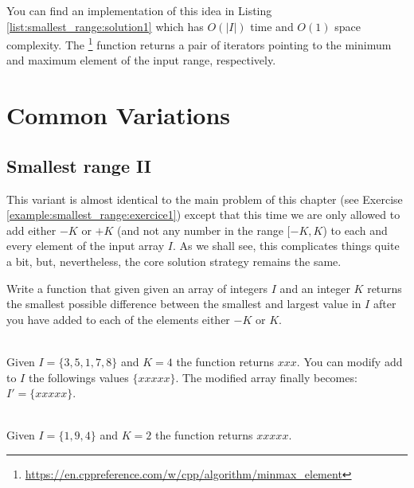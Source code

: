 You can find an implementation of this idea in Listing \ref{list:smallest_range:solution1} which has
$O(|I|)$ time and $O(1)$ space complexity.
The \footnote{\url{https://en.cppreference.com/w/cpp/algorithm/minmax_element}} 
function  returns a pair of iterators pointing to the minimum and maximum element of the input range, respectively.



\section{Common Variations}
\subsection{Smallest range \RN{2} } 
This variant is almost identical to the main problem of this
chapter (see Exercise \ref{example:smallest_range:exercice1}) 
except that this time we are only allowed to add either $-K$ or $+K$ (and not any number in the range $[-K,K$)
to each and every element of the input array $I$. 
As we shall see, this complicates things quite a bit,
but, nevertheless, the core solution strategy remains the same. 

\begin{exercise}
	\label{example:smallest_range:variation1:exercice1}
	Write a function that given given an array of integers $I$ and an integer $K$ returns the
	smallest possible difference between the smallest and largest value in $I$ after you have added
	to each of the elements either $-K$ or $K$.
	
		\begin{example}
			\label{example:smallest_range:variation1:example1}
			\hfill \\
			Given $I = \{3,5,1,7,8\}$ and $K=4$ the function returns $xxx$. You can modify add to
			$I$ the followings values $\{xxxxx\}$. The modified array finally becomes:
			$I'=\{xxxxx\}$. 
			
		\end{example}
	
		\begin{example}
			\label{example:smallest_range:variation1:example2}
			\hfill \\
			Given $I = \{1,9,4\}$ and $K=2$ the function returns $xxxxx$.
		\end{example}
	
	\end{exercise}


